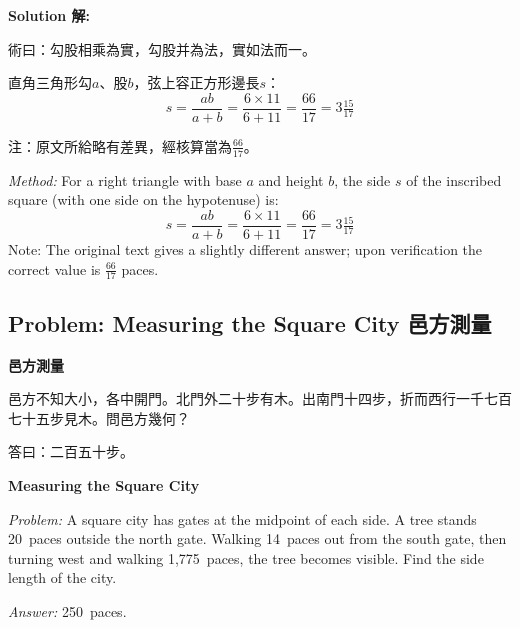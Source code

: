 \documentclass[11pt,a4paper]{article}
\newcommand{\zh}[1]{{\CJKfamily{\CJKrmdefault} #1}}
\newenvironment{chside}{%
  \begin{minipage}[t]{0.48\textwidth}%
  \setlength{\parindent}{1.5em}%
  \linespread{1.25}\selectfont%
  \small%
}{%
  \end{minipage}%
}
\newenvironment{enside}{%
  \hfill\begin{minipage}[t]{0.48\textwidth}%
  \setlength{\parindent}{1em}%
  \linespread{1.15}\selectfont%
  \small%
}{%
  \end{minipage}%
}
\newenvironment{solution}{%
  \par\medskip\noindent\textbf{\textcolor{notecolor}{Solution \zh{解}:}}\par\nopagebreak
  \small\setlength{\parindent}{1em}%
}{%
  \par\medskip%
}
\begin{document}
\begin{solution}
\noindent\begin{chside}
\zh{術曰：勾股相乘為實，勾股并為法，實如法而一。}

直角三角形勾$a$、股$b$，弦上容正方形邊長$s$：
\[
s = \frac{ab}{a + b} = \frac{6 \times 11}{6 + 11} = \frac{66}{17} = 3\tfrac{15}{17}
\]

注：原文所給略有差異，經核算當為$\frac{66}{17}$。
\end{chside}%
\begin{enside}
\textit{Method:} For a right triangle with base $a$ and height $b$, the side
$s$ of the inscribed square (with one side on the hypotenuse) is:
\[
s = \frac{ab}{a + b} = \frac{6 \times 11}{6 + 11} = \frac{66}{17} = 3\tfrac{15}{17}
\]
Note: The original text gives a slightly different answer; upon verification
the correct value is $\frac{66}{17}$ paces.
\end{enside}
\end{solution}

\subsection{Problem: Measuring the Square City \zh{邑方測量}}

\noindent\begin{chside}
\noindent\textbf{邑方測量}

\zh{邑方不知大小，各中開門。北門外二十步有木。出南門十四步，折而西行一千七百七十五步見木。問邑方幾何？}

\medskip
\zh{答曰：二百五十步。}
\end{chside}%
\begin{enside}
\noindent\textbf{Measuring the Square City}

\textit{Problem:} A square city has gates at the midpoint of each side. A
tree stands 20~paces outside the north gate. Walking 14~paces out from the
south gate, then turning west and walking 1,775~paces, the tree becomes
visible. Find the side length of the city.

\medskip
\textit{Answer:} 250~paces.
\end{enside}
\end{document}
